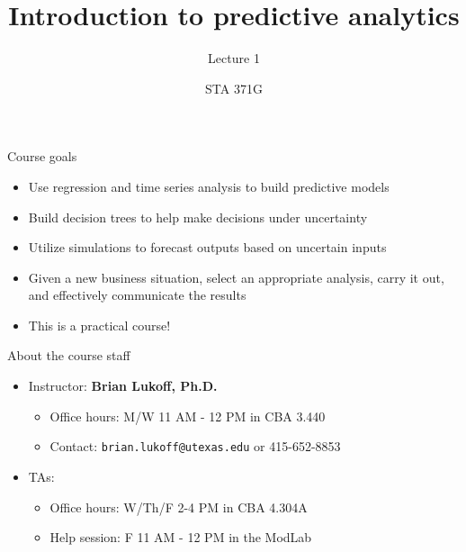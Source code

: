 \documentclass{beamer}\usepackage[]{graphicx}\usepackage[]{color}
\title{Introduction to predictive analytics}
\subtitle{Lecture 1}
\author{STA 371G}
\begin{document}
  \frame{\maketitle}



  \begin{darkframes}
    \begin{frame}{Course goals}
      \begin{itemize}
        \item Use regression and time series analysis to build predictive models
        \item Build decision trees to help make decisions under uncertainty
        \item Utilize simulations to forecast outputs based on uncertain inputs
        \item Given a new business situation, select an appropriate analysis, carry it out, and effectively communicate the results
        \item \alert{This is a practical course!}
      \end{itemize}
    \end{frame}

    \begin{frame}{About the course staff}
      \begin{itemize}
        \item Instructor: \textbf{Brian Lukoff, Ph.D.}
          \begin{itemize}
            \item Office hours: M/W 11 AM - 12 PM in CBA 3.440
            \item Contact: \texttt{brian.lukoff@utexas.edu} or 415-652-8853
          \end{itemize}
        \item TAs:
          \begin{itemize}
            \item Office hours: W/Th/F 2-4 PM in CBA 4.304A
            \item Help session: F 11 AM - 12 PM in the ModLab
          \end{itemize}


\end{itemize}
\end{frame}
\end{darkframes}
\end{document}

